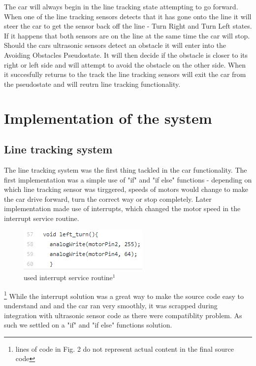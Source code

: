 \documentclass[conference]{IEEEtran}
\begin{document}
The car will always begin in the line tracking state attempting to go forward. When one of the line tracking sensors detects that it has gone onto the line it will steer the car to get the sensor back off the line - Turn Right and Turn Left states. If it happens that both sensors are on the line at the same time the car will stop. Should the cars ultrasonic sensors detect an obstacle it will enter into the Avoiding Obstacles Pseudostate. It will then decide if the obstacle is closer to its right or left side and will attempt to avoid the obstacle on the other side. When it succesfully returns to the track the line tracking sensors will exit the car from the pseudostate and will reutrn line tracking functionality.

\section{Implementation of the system}
\subsection{Line tracking system}
The line tracking system was the first thing tackled in the car functionality. The first implementation was a simple use of "if" and "if else" functions - depending on which line tracking sensor was tirggered, speeds of motors would change to make the car drive forward, turn the correct way or stop completely. Later implementation made use of interrupts, which changed the motor speed in the interrupt service routine.
\begin{figure}[h!]
	\includegraphics[width=\linewidth]{examplecode1.png}
	\caption{used interrupt service routine$^{1}$}
	\label{fig:EXC1}
\end{figure}
\footnote{lines of code in Fig. 2 do not represent actual content in the final source code}
While the interrupt solution was a great way to make the source code easy to understand and and the car ran very smoothly, it was scrapped during integration with ultrasonic sensor code as there were compatiblity problem. As such we settled on a "if" and "if else" functions solution.
\end{document}
